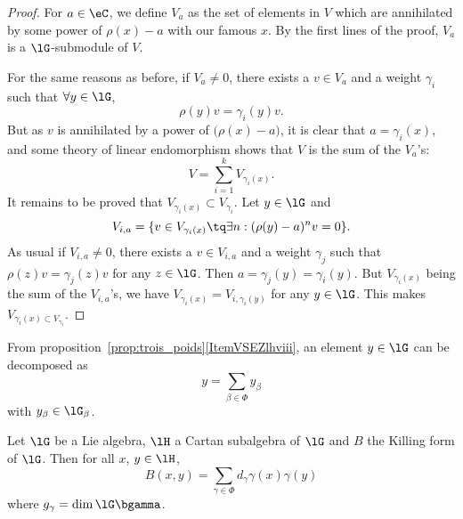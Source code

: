 \begin{proof}
	For $a\in\eC$, we define $V_a$ as the set of elements in $V$ which are annihilated by some power of $\rho(x)-a$ with our famous $x$. By the first lines of the proof, $V_a$ is a $\lG$-submodule of $V$.

	For the same reasons as before, if $V_a\neq 0$, there exists a $v\in V_a$ and a weight $\gamma_i$ such that $\forall y\in\lG$,
	\[
		\rho(y)v=\gamma_i(y)v.
	\]
	But as $v$ is annihilated by a power of $\big( \rho(x)-a \big)$, it is clear that $a=\gamma_i(x)$, and some theory of linear endomorphism shows that $V$ is the sum of the $V_a$'s:
	\begin{equation}
		V=\sum_{i=1}^kV_{\gamma_i(x)}.
	\end{equation}
	It remains to be proved that $V_{\gamma_i(x)}\subset V_{\gamma_i}$. Let $y\in\lG$ and
	\[
		V_{i,a}=\{ v\in V_{\gamma_i(x)}\tq\exists n: (\rho(y)-a)^nv=0 \}.
	\]
	As usual if $V_{i,a}\neq 0$, there exists a $v\in V_{i,a}$ and a weight $\gamma_j$ such that $\rho(z)v=\gamma_j(z)v$ for any $z\in\lG$. Then $a=\gamma_j(y)=\gamma_i(y)$. But $V_{\gamma_i(x)}$ being the sum of the $V_{i,a}$'s, we have $V_{\gamma_i(x)}=V_{i,\gamma_i(y)}$ for any $y\in\lG$. This makes $V_{\gamma_i(x)\subset V_{\gamma_i}}$.

\end{proof}

From proposition~\ref{prop:trois_poids}\ref{ItemVSEZlhviii}, an element $y\in\lG$ can be decomposed as
\begin{equation}\label{eq:decomp_racine}
	y=\sum_{\beta\in\Phi}y_{\beta}
\end{equation}
with $y_{\beta}\in\lG_{\beta}$.

\begin{theorem} \label{tho:Killing_Cartan}
	Let $\lG$ be a Lie algebra, $\lH$ a Cartan subalgebra of $\lG$ and $B$ the Killing form of $\lG$. Then for all $x$, $y\in\lH$,
	\begin{equation}
		B(x,y)=\sum_{\gamma\in\Phi}d_{\gamma}\gamma(x)\gamma(y)
	\end{equation}
	where $g_{\gamma}=\dim\lG\bgamma$.
\end{theorem}


